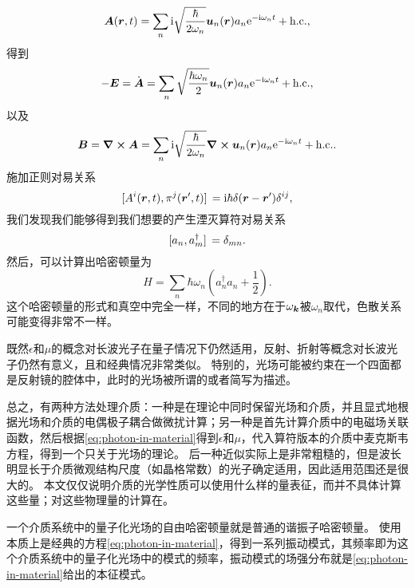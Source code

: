 \begin{equation}
    \vb*{A}(\vb*{r}, t) = \sum_n \mathrm{i} \sqrt{\frac{\hbar}{2\omega_{n}}} \vb*{u}_n(\vb*{r}) a_n \mathrm{e}^{- \mathrm{i} \omega_n t} + \text{h.c.},
\end{equation}
得到
\begin{equation}
    - \vb*{E} = \dot{\vb*{A}} = \sum_n \sqrt{\frac{\hbar \omega_n}{2}} \vb*{u}_n(\vb*{r}) a_n \mathrm{e}^{-\mathrm{i} \omega_n t} + \text{h.c.},
\end{equation}
以及
\begin{equation}
    \vb*{B} = \curl{\vb*{A}} = \sum_n \mathrm{i} \sqrt{\frac{\hbar}{2\omega_n}} \curl{\vb*{u}_n(\vb*{r})} a_n \mathrm{e}^{-\mathrm{i} \omega_n t} + \text{h.c.}.
\end{equation}
施加正则对易关系
\begin{equation}
    \comm*{A^i(\vb*{r}, t)}{\pi^j(\vb*{r}', t)} = \ii \hbar \delta(\vb*{r} - \vb*{r}') \delta^{ij},
\end{equation}
我们发现我们能够得到我们想要的产生湮灭算符对易关系
\begin{equation}
    \comm*{a_n}{a_m^\dagger} = \delta_{mn}.
\end{equation}
然后，可以计算出哈密顿量为
\begin{equation}
    H = \sum_n \hbar \omega_n \left( a^\dagger_n a_n + \frac{1}{2} \right).
\end{equation}
这个哈密顿量的形式和真空中完全一样，不同的地方在于$\omega_{\vb*{k}}$被$\omega_n$取代，色散关系可能变得非常不一样。

既然$\epsilon$和$\mu$的概念对长波光子在量子情况下仍然适用，反射、折射等概念对长波光子仍然有意义，且和经典情况非常类似。
特别的，光场可能被约束在一个四面都是反射镜的腔体中，此时的光场被所谓的或者简写为描述。

总之，有两种方法处理介质：一种是在理论中同时保留光场和介质，并且显式地根据光场和介质的电偶极子耦合做微扰计算；另一种是首先计算介质中的电磁场关联函数，然后根据\eqref{eq:photon-in-material}得到$\epsilon$和$\mu$，代入算符版本的介质中麦克斯韦方程，得到一个只关于光场的理论。
后一种近似实际上是非常粗糙的，但是波长明显长于介质微观结构尺度（如晶格常数）的光子确定适用，因此适用范围还是很大的。
本文仅仅说明介质的光学性质可以使用什么样的量表征，而并不具体计算这些量；对这些物理量的计算在。

一个介质系统中的量子化光场的自由哈密顿量就是普通的谐振子哈密顿量。
使用本质上是经典的方程\eqref{eq:photon-in-material}，得到一系列振动模式，其频率即为这个介质系统中的量子化光场中的模式的频率，振动模式的场强分布就是\eqref{eq:photon-in-material}给出的本征模式。

